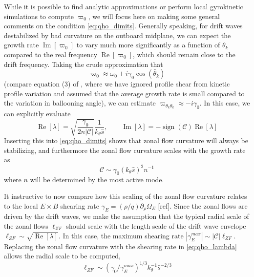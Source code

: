 \documentclass[]{article}
\begin{document}
While it is possible to find analytic approximations or perform local gyrokinetic simulations to compute \(\varpi_0\), we will focus here on making some general comments on the condition \eqref{eq:qho_dimits}.
Generally speaking, for drift waves destabilized by bad curvature on the outboard midplane, we can expect the growth rate \(\operatorname{Im}[\varpi_0]\) to vary much more significantly as a function of \(\theta_k\) compared to the real frequency \(\operatorname{Re}[\varpi_0]\), which should remain close to the drift frequency.
Taking the crude approximation that
\begin{equation*}
    \varpi_0 \approx \omega_0 + i \gamma_0 \cos(\bar{\theta}_k)
\end{equation*}
(compare equation (3) of \citet{waltz_theory_1998}, where we have ignored profile shear from kinetic profile variation and assumed that the average growth rate is small compared to the variation in ballooning angle), we can estimate \(\varpi_{\theta_k \theta_k} \approx -i \gamma_0\).
In this case, we can explicitly evaluate
\begin{equation} \label{eq:qho_lambda}
    \operatorname{Re}[\lambda] = \sqrt{\frac{\gamma_0}{2 n |\mathcal{C}|}} \frac{1}{k_\theta \hat{s}}, \qquad \operatorname{Im}[\lambda] = -\operatorname{sign}(\mathcal{C}) \operatorname{Re}[\lambda]
\end{equation}
Inserting this into \eqref{eq:qho_dimits} shows that zonal flow curvature will always be stabilizing, and furthermore the zonal flow curvature scales with the growth rate as
\begin{equation}
    \mathcal{C} \sim \gamma_0 (k_\theta \hat{s})^2 n^{-1}
\end{equation}
where \(n\) will be determined by the most active mode.

It instructive to now compare how this scaling of the zonal flow curvature relates to the local \(E \times B\) shearing rate \(\gamma_E = (\rho/q) \partial_\rho \Omega_E\) [ref].
Since the zonal flows are driven by the drift waves, we make the assumption that the typical radial scale of the zonal flows \(\ell_{ZF}\) should scale with the length scale of the drift wave envelope \(\ell_{ZF} \sim \sqrt{\operatorname{Re}[\lambda]}\).
In this case, the maximum shearing rate \(|\gamma_E^{max}| \sim |\mathcal{C}| \ell_{ZF}\).
Replacing the zonal flow curvature with the shearing rate in \eqref{eq:qho_lambda} allows the radial scale to be computed,
\begin{equation*}
    \ell_{ZF} \sim (\gamma_0/\gamma_E^{max})^{1/3} k_\theta^{-1} \hat{s}^{-2/3}
\end{equation*}
\end{document}
